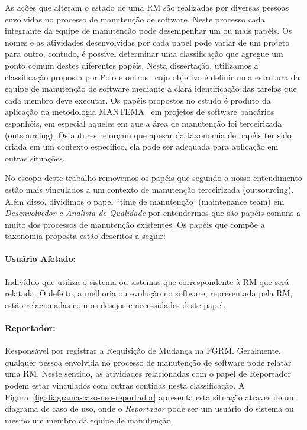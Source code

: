 As ações que alteram o estado de uma RM são realizadas por diversas pessoas
envolvidas no processo de manutenção de software. Neste processo cada integrante
da equipe de manutenção pode desempenhar um ou mais papéis. Os nomes e as
atividades desenvolvidas por cada papel pode variar de um projeto para outro,
contudo, é possível determinar uma classificação que agregue um ponto comum
destes diferentes papéis. Nesta dissertação, utilizamos a classificação proposta
por Polo e outros~\cite{Polo1999} cujo objetivo é definir uma estrutura da
equipe de manutenção de software mediante a clara identificação das tarefas que
cada membro deve executar. Os papéis propostos no estudo é produto da aplicação
da metodologia MANTEMA~\cite{756695} em projetos de software bancários
espanhóis, em especial aqueles em que a área de manutenção foi terceirizada
(outsourcing). Os autores reforçam que apesar da taxonomia de papéis ter sido
criada em um contexto específico, ela pode ser adequada para aplicação em outras
situações.

No escopo deste trabalho removemos os papéis que segundo o nosso entendimento
estão mais vinculados a um contexto de manutenção terceirizada (outsourcing).
Além disso, dividimos o papel ``time de manutenção' (maintenance team) em
\textit{Desenvolvedor e Analista de Qualidade} por entendermos que são papéis
comuns a muito dos processos de manutenção existentes. Os papéis que compõe a
taxonomia proposta estão descritos a seguir:

\paragraph{Usuário Afetado:}
Indivíduo que utiliza o sistema ou sistemas que correspondente à RM que será
relatada. O defeito, a melhoria ou evolução no software, representada pela RM,
estão relacionadas com os desejos e necessidades deste papel.

\paragraph{Reportador:}
Responsável por registrar a Requisição de Mudança na FGRM\@. Geralmente,
qualquer pessoa envolvida no processo de manutenção de software pode relatar uma
RM. Neste sentido, as atividades relacionadas com o papel de Reportador podem
estar vinculados com outras contidas nesta classificação. A
Figura~\ref{fig:diagrama-caso-uso-reportador} apresenta esta situação através de
um diagrama de caso de uso, onde o \textit{Reportador} pode ser um usuário do
sistema ou mesmo um membro da equipe de manutenção.

